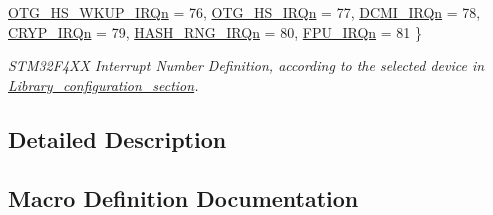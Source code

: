 \begin{DoxyCompactItemize}
\newline
\hyperlink{group___configuration__section__for___c_m_s_i_s_gga666eb0caeb12ec0e281415592ae89083a9e5c9d81dd3985a88094f8158c0f0267}{O\+T\+G\+\_\+\+H\+S\+\_\+\+W\+K\+U\+P\+\_\+\+I\+R\+Qn} = 76, 
\hyperlink{group___configuration__section__for___c_m_s_i_s_gga666eb0caeb12ec0e281415592ae89083aad2d5e47d27fe3a02f7059b20bb729c0}{O\+T\+G\+\_\+\+H\+S\+\_\+\+I\+R\+Qn} = 77, 
\hyperlink{group___configuration__section__for___c_m_s_i_s_gga666eb0caeb12ec0e281415592ae89083ace3c0fc2c4d05a7c02e3c987da5bc8e8}{D\+C\+M\+I\+\_\+\+I\+R\+Qn} = 78, 
\hyperlink{group___configuration__section__for___c_m_s_i_s_gga666eb0caeb12ec0e281415592ae89083a70c9645bf48ca539510cc8f7d974f017}{C\+R\+Y\+P\+\_\+\+I\+R\+Qn} = 79, 
\newline
\hyperlink{group___configuration__section__for___c_m_s_i_s_gga666eb0caeb12ec0e281415592ae89083a86a161642b54055f9bbea3937e6352de}{H\+A\+S\+H\+\_\+\+R\+N\+G\+\_\+\+I\+R\+Qn} = 80, 
\hyperlink{group___configuration__section__for___c_m_s_i_s_gga666eb0caeb12ec0e281415592ae89083aa6b8ff01b016a798c6e639728c179e4f}{F\+P\+U\+\_\+\+I\+R\+Qn} = 81
 \}\begin{DoxyCompactList}\small\item\em S\+T\+M32\+F4\+XX Interrupt Number Definition, according to the selected device in \hyperlink{group___library__configuration__section}{Library\+\_\+configuration\+\_\+section}. \end{DoxyCompactList}
\end{DoxyCompactItemize}


\subsection{Detailed Description}


\subsection{Macro Definition Documentation}
\mbox{\label{group___configuration__section__for___c_m_s_i_s_ga45a97e4bb8b6ce7c334acc5f45ace3ba}} 
